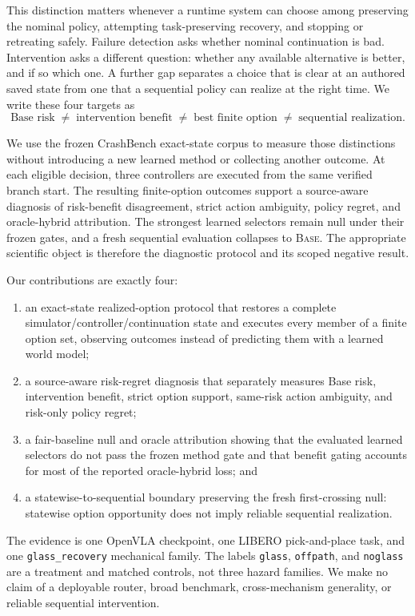 \documentclass[10pt]{article}
\newcommand{\Base}{\textsc{Base}\xspace}
\begin{document}
This distinction matters whenever a runtime system can choose among preserving
the nominal policy, attempting task-preserving recovery, and stopping or
retreating safely. Failure detection asks whether nominal continuation is bad.
Intervention asks a different question: whether any available alternative is
better, and if so which one. A further gap separates a choice that is clear at
an authored saved state from one that a sequential policy can realize at the
right time. We write these four targets as
\[
  \text{Base risk}\;\neq\;\text{intervention benefit}
  \;\neq\;\text{best finite option}
  \;\neq\;\text{sequential realization}.
\]

We use the frozen CrashBench exact-state corpus to measure those distinctions
without introducing a new learned method or collecting another outcome. At
each eligible decision, three controllers are executed from the same verified
branch start. The resulting finite-option outcomes support a source-aware
diagnosis of risk-benefit disagreement, strict action ambiguity, policy
regret, and oracle-hybrid attribution. The strongest learned selectors remain
null under their frozen gates, and a fresh sequential evaluation collapses to
\Base. The appropriate scientific object is therefore the diagnostic protocol
and its scoped negative result.

Our contributions are exactly four:
\begin{enumerate}
  \item an exact-state realized-option protocol that restores a complete
  simulator/controller/continuation state and executes every member of a
  finite option set, observing outcomes instead of predicting them with a
  learned world model;
  \item a source-aware risk-regret diagnosis that separately measures Base
  risk, intervention benefit, strict option support, same-risk action
  ambiguity, and risk-only policy regret;
  \item a fair-baseline null and oracle attribution showing that the evaluated
  learned selectors do not pass the frozen method gate and that benefit gating
  accounts for most of the reported oracle-hybrid loss; and
  \item a statewise-to-sequential boundary preserving the fresh first-crossing
  null: statewise option opportunity does not imply reliable sequential
  realization.
\end{enumerate}

The evidence is one OpenVLA checkpoint, one LIBERO pick-and-place task, and one
\texttt{glass\_recovery} mechanical family. The labels \texttt{glass},
\texttt{offpath}, and \texttt{noglass} are a treatment and matched controls,
not three hazard families. We make no claim of a deployable router, broad
benchmark, cross-mechanism generality, or reliable sequential intervention.
\end{document}
